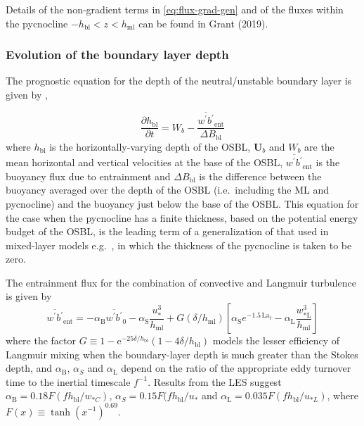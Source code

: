 \documentclass[../main/NEMO_manual]{subfiles}
\begin{document}
Details of the non-gradient terms in \eqref{eq:flux-grad-gen} and of the fluxes within the pycnocline $-h_{\mathrm{bl}}<z<h_{\mathrm{ml}}$ can be found in Grant (2019).

\subsubsection{Evolution of the boundary layer depth}

The prognostic equation for the depth of the neutral/unstable boundary layer is given by \citep{grant+etal18},

\begin{equation} \label{eq:dhdt-unstable}
\frac{\partial h_\mathrm{bl}}{\partial t} = W_b - \frac{{\overline{w^\prime b^\prime}}_\mathrm{ent}}{\Delta B_\mathrm{bl}}
\end{equation}
where $h_\mathrm{bl}$ is the horizontally-varying depth of the OSBL,
$\mathbf{U}_b$ and $W_b$ are the mean horizontal and vertical
velocities at the base of the OSBL, ${\overline{w^\prime
    b^\prime}}_\mathrm{ent}$ is the buoyancy flux due to entrainment
and $\Delta B_\mathrm{bl}$ is the difference between the buoyancy
averaged over the depth of the OSBL (i.e.\ including the ML and
pycnocline) and the buoyancy just below the base of the OSBL. This
equation for the case when the pycnocline has a finite thickness,
based on the potential energy budget of the OSBL, is the leading term
\citep{grant+etal18} of a generalization of that used in mixed-layer
models e.g.\ \citet{kraus.turner_tellus67}, in which the thickness of the pycnocline is taken to be zero.

The entrainment flux for the combination of convective and Langmuir turbulence is given by
\begin{equation} \label{eq:entrain-flux}
  {\overline{w^\prime b^\prime}}_\mathrm{ent} = -\alpha_{\mathrm{B}} {\overline{w^\prime b^\prime}}_0 - \alpha_{\mathrm{S}} \frac{u_*^3}{h_{\mathrm{ml}}}
  + G\left(\delta/h_{\mathrm{ml}} \right)\left[\alpha_{\mathrm{S}}e^{-1.5\, \mathrm{La}_t}-\alpha_{\mathrm{L}} \frac{w_{\mathrm{*L}}^3}{h_{\mathrm{ml}}}\right]
\end{equation}
where the factor $G\equiv 1 - \mathrm{e}^ {-25\delta/h_{\mathrm{bl}}}(1-4\delta/h_{\mathrm{bl}})$ models the lesser efficiency of Langmuir mixing when the boundary-layer depth is much greater than the Stokes depth, and $\alpha_{\mathrm{B}}$, $\alpha_{S}$  and $\alpha_{\mathrm{L}}$ depend on the ratio of the appropriate eddy turnover time to the inertial timescale $f^{-1}$. Results from the LES suggest $\alpha_{\mathrm{B}}=0.18 F(fh_{\mathrm{bl}}/w_{*C})$, $\alpha_{S}=0.15 F(fh_{\mathrm{bl}}/u_*$  and $\alpha_{\mathrm{L}}=0.035 F(fh_{\mathrm{bl}}/u_{*L})$, where $F(x)\equiv\tanh(x^{-1})^{0.69}$.
\end{document}
